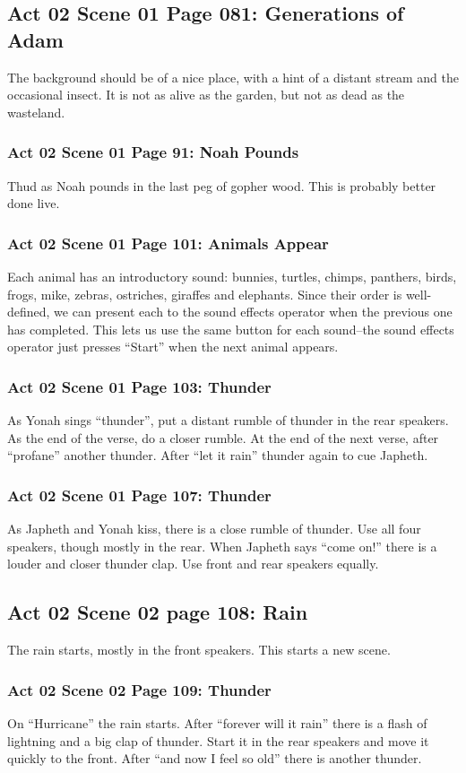 \documentclass[letterpaper,twoside]{article}
\begin{document}
\subsection{Act 02 Scene 01 Page 081: Generations of Adam}
The background should be of a nice place, with a hint of a distant
stream and the occasional insect.  It is not as alive as the garden,
but not as dead as the wasteland.
\subsubsection{Act 02 Scene 01 Page 91: Noah Pounds}
Thud as Noah pounds in the last peg of gopher wood.
This is probably better done live.
\subsubsection{Act 02 Scene 01 Page 101: Animals Appear}
Each animal has an introductory sound: bunnies, turtles, chimps,
panthers, birds, frogs, mike, zebras, ostriches, giraffes and elephants.
Since their order is well-defined, we can present each to the sound
effects operator when the previous one has completed.  This lets us
use the same button for each sound--the sound effects operator
just presses ``Start'' when the next animal appears.
\subsubsection{Act 02 Scene 01 Page 103: Thunder}
As Yonah sings ``thunder'', put a distant rumble of thunder in the
rear speakers.  As the end of the verse, do a closer rumble.
At the end of the next verse, after ``profane'' another thunder.
After ``let it rain'' thunder again to cue Japheth.
\subsubsection{Act 02 Scene 01 Page 107: Thunder}
As Japheth and Yonah kiss, there is a close rumble of thunder.
Use all four speakers, though mostly in the rear.
When Japheth says ``come on!'' there is a louder and closer
thunder clap.  Use front and rear speakers equally.
\subsection{Act 02 Scene 02 page 108: Rain}
The rain starts, mostly in the front speakers.  This starts a new scene.
\subsubsection{Act 02 Scene 02 Page 109: Thunder}
On ``Hurricane'' the rain starts.
After ``forever will it rain'' there is a flash of lightning
and a big clap of thunder.  Start it in the rear speakers
and move it quickly to the front.
After ``and now I feel so old'' there is another thunder.
\end{document}

